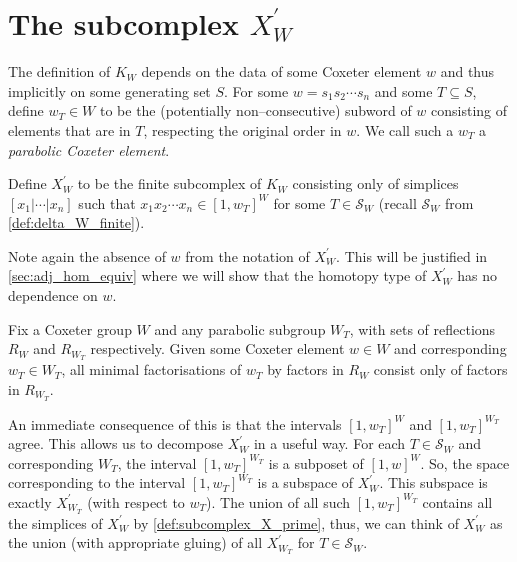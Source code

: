 \documentclass[class=article, crop=false]{standalone}
\begin{document}
\section{The subcomplex \texorpdfstring{$X_{W}^\prime$}{X W Prime}}
The definition of $K_{W}$ depends on the data of some Coxeter element $w$ and thus implicitly on some generating set $S$. For some $w = s_1s_2\cdots s_n$ and some $T\subseteq S$, define $w_T\in W$ to be the (potentially non--consecutive) subword of $w$ consisting of elements that are in $T$, respecting the original order in $w$. We call such a $w_T$ a \emph{parabolic Coxeter element}.
\begin{definition}
    Define $X_{W}^\prime$ to be the finite subcomplex of $K_{W}$ consisting only of simplices $[x_1 | \cdots | x_n]$ such that $x_1x_2\cdots x_n \in [1,w_T]^W$ for some $T \in \mathcal{S}_W$ (recall $\mathcal{S}_W$ from \cref{def:delta_W_finite}).
    \label{def:subcomplex_X_prime}
\end{definition}
Note again the absence of $w$ from the notation of $X^\prime_W$. This will be justified in \cref{sec:adj_hom_equiv} where we will show that the homotopy type of $X_W^\prime$ has no dependence on $w$.

\begin{lemma}[{\hspace{1sp}\cite[Lemma 5.2]{paolini_salvetti_kpi1_2021}}]
    Fix a Coxeter group $W$ and any parabolic subgroup $W_T$, with sets of reflections $R_W$ and $R_{W_T}$ respectively. Given some Coxeter element $w \in W$ and corresponding $w_T \in W_T$, all minimal factorisations of $w_T$ by factors in $R_W$ consist only of factors in $R_{W_T}$.
    \label{lem:all_decompositions_of_w_T_are_R}
\end{lemma}
An immediate consequence of this is that the intervals $[1,w_T]^W$ and $[1,w_T]^{W_T}$ agree. This allows us to decompose $X^\prime_W$ in a useful way. For each $T \in \mathcal{S}_W$ and corresponding $W_T$, the interval $[1,w_T]^{W_T}$ is a subposet of $[1,w]^W$. So, the space corresponding to the interval $[1,w_T]^{W_T}$ is a subspace of $X^\prime_W$. This subspace is exactly $X^\prime_{W_T}$ (with respect to $w_T$). The union of all such $[1,w_T]^{W_T}$ contains all the simplices of $X_W^\prime$ by \cref{def:subcomplex_X_prime}, thus, we can think of $X^\prime_W$ as the union (with appropriate gluing) of all $X^\prime_{W_T}$ for $T \in \mathcal{S}_W$.
\end{document}
